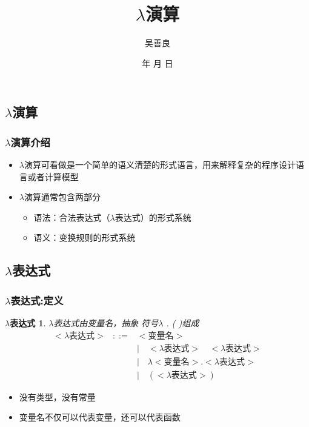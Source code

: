 \documentclass[CJKutf8,compress,hyperref]{beamer}
\renewcommand{\today}{\number\year 年 \number\month 月 \number\day 日}
\begin{document}
\begin{CJK}{UTF8}{song}
 
\title{ $\lambda$演算}
\author{ 吴善良}
\date{ \today}

\frame{\titlepage}
\tableofcontents
\section{ $\lambda$演算}

\begin{frame}
  \frametitle{ $\lambda$演算介绍}
  \begin{itemize}
  \item $\lambda$演算可看做是一个简单的语义清楚的形式语言，用来解释复杂的程序设计语言或者计算模型
  \item $\lambda$演算通常包含两部分
    \begin{itemize} 
    \item{语法}：合法表达式（{\color{red}$\lambda$}表达式）的形式系统
    \item{语义}：变换规则的形式系统
    \end{itemize}
  \end{itemize}
\end{frame}

\subsection{  $\lambda$表达式}

\begin{frame}
  \frametitle{ $\lambda$表达式:定义}
  \newtheorem{LE}{$\lambda$表达式} 
  \begin{LE}
    $\lambda$表达式由变量名，抽象
    符号$\lambda$ . ( )组成 
    \begin{eqnarray}
      <\textrm{$\lambda$表达式}> & ::= & <\textrm{变量名}> \\
                                 & & \mid\quad <\textrm{$\lambda$表达式}>\quad<\textrm{$\lambda$表达式}> \\ 
                                 & & \mid\quad \lambda<\textrm{变量名}>.<\textrm{$\lambda$表达式}> \\
                                 & & \mid\quad (<\textrm{$\lambda$表达式}>)
    \end{eqnarray} 
  \end{LE}      
  \begin{itemize}
  \item 没有类型，没有常量 
  \item 变量名不仅可以代表变量，还可以代表{\color{blue}函数}
  \end{itemize}
\end{frame}


\end{CJK}
\end{document}
